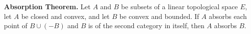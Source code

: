 \textbf{Absorption Theorem.} Let $A$ and $B$ be subsets of a linear topological space $E$, let $A$ be closed and convex, and let $B$ be convex and bounded. If $A$ absorbs each point of $B \cup (-B)$ and $B$ is of the second category in itself, then $A$ absorbs $B$.
